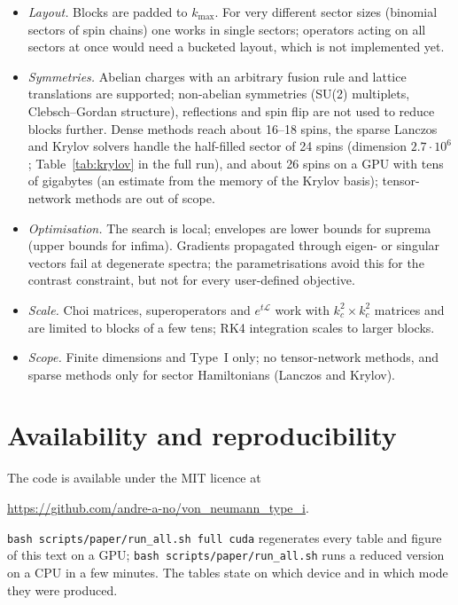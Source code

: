 \documentclass[11pt]{article}
\begin{document}
\begin{itemize}
\item \emph{Layout.} Blocks are padded to $k_{\max}$. For very different sector sizes (binomial sectors of
spin chains) one works in single sectors; operators acting on all sectors at once would need a bucketed
layout, which is not implemented yet.
\item \emph{Symmetries.} Abelian charges with an arbitrary fusion rule and lattice translations are
supported; non-abelian symmetries (SU(2) multiplets, Clebsch--Gordan structure), reflections and spin flip
are not used to reduce blocks further. Dense methods reach about 16--18 spins, the sparse Lanczos and
Krylov solvers handle the half-filled sector of 24 spins (dimension $2.7\cdot10^6$; Table~\ref{tab:krylov} in the
full run), and about 26 spins on a GPU with tens of gigabytes (an estimate from the memory of the Krylov basis); tensor-network methods are out of
scope.
\item \emph{Optimisation.} The search is local; envelopes are lower bounds for suprema (upper bounds for
infima). Gradients propagated through eigen- or singular vectors fail at degenerate spectra; the
parametrisations avoid this for the contrast constraint, but not for every user-defined objective.
\item \emph{Scale.} Choi matrices, superoperators and $e^{t\mathcal L}$ work with $k_c^2\times k_c^2$
matrices and are limited to blocks of a few tens; RK4 integration scales to larger blocks.
\item \emph{Scope.} Finite dimensions and Type~I only; no tensor-network methods, and sparse methods only for
sector Hamiltonians (Lanczos and Krylov).
\end{itemize}

\section{Availability and reproducibility}

The code is available under the MIT licence at
\begin{center}\url{https://github.com/andre-a-no/von_neumann_type_i}.\end{center}
\texttt{bash scripts/paper/run\_all.sh full cuda} regenerates every table and figure of this text on a GPU;
\texttt{bash scripts/paper/run\_all.sh} runs a reduced version on a CPU in a few minutes. The tables
state on which device and in which mode they were produced.
\end{document}
